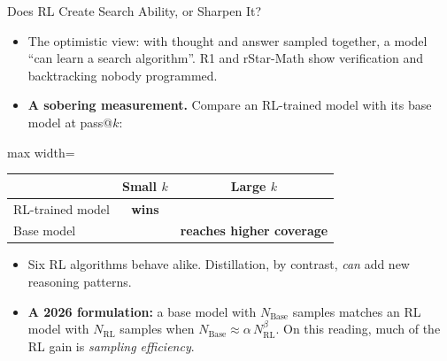 \begin{frame}{Does RL Create Search Ability, or Sharpen It?}
    \begin{itemize}\itemsep0.45em
        \item The optimistic view: with thought and answer sampled together, a model ``can learn a search algorithm''. R1 and rStar-Math show verification and backtracking nobody programmed.
        \item \textbf{A sobering measurement.} Compare an RL-trained model with its base model at pass@$k$:
    \end{itemize}
    \begin{center}
    \small
    \begin{adjustbox}{max width=\linewidth}\begin{tabular}{lcc}
        \toprule
        & \textbf{Small $k$} & \textbf{Large $k$} \\
        \midrule
        RL-trained model & \textbf{wins} & \\
        Base model & & \textbf{reaches higher coverage} \\
        \bottomrule
    \end{tabular}\end{adjustbox}
    \end{center}
    \begin{itemize}\itemsep0.45em
        \item Six RL algorithms behave alike. Distillation, by contrast, \emph{can} add new reasoning patterns.
        \item \textbf{A 2026 formulation:} a base model with $N_{\text{Base}}$ samples matches an RL model with $N_{\text{RL}}$ samples when $N_{\text{Base}}\approx\alpha\,N_{\text{RL}}^{\beta}$. On this reading, much of the RL gain is \emph{sampling efficiency}.
    \end{itemize}
    \vspace{0.1em}
\end{frame}

